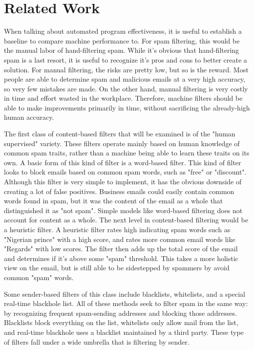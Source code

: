 \documentclass{article}
\begin{document}
\section{Related Work}
\begin{paragraph}
When talking about automated program effectiveness, it is useful to establish a baseline to compare machine performance to. For spam filtering, this would be the manual labor of hand-filtering spam. While it's obvious that hand-filtering spam is a last resort, it is useful to recognize it's pros and cons to better create a solution. For manual filtering, the risks are pretty low, but so is the reward. Most people are able to determine spam and malicious emails at a very high accuracy, so very few mistakes are made. On the other hand, manual filtering is very costly in time and effort wasted in the workplace. Therefore, machine filters should be able to make improvements primarily in time, without sacrificing the already-high human accuracy.
\cite{cormack_2008}
\end{paragraph}
\begin{paragraph}
The first class of content-based filters that will be examined is of the "human supervised" variety. These filters operate mainly based on human knowledge of common spam traits, rather than a machine being able to learn these traits on its own. A basic form of this kind of filter is a word-based filter. This kind of filter looks to block emails based on common spam words, such as "free" or "discount". Although this filter is very simple to implement, it has the obvious downside of creating a lot of false positives. Business emails could easily contain common words found in spam, but it was the content of the email as a whole that distinguished it as "not spam". Simple models like word-based filtering does not account for content as a whole. The next level in content-based filtering would be a heuristic filter. A heuristic filter rates high indicating spam words such as "Nigerian prince" with a high score, and rates more common email words like "Regards" with low scores. The filter then adds up the total score of the email and determines if it's above some "spam" threshold. This takes a more holistic view on the email, but is still able to be sidestepped by spammers by avoid common "spam" words. 
\cite{gomez2000combining}
\end{paragraph}
\begin{paragraph}
Some sender-based filters of this class include blacklists, whitelists, and a special real-time blackhole list. All of these methods seek to filter spam in the same way: by recognizing frequent spam-sending addresses and blocking those addresses. Blacklists block everything on the list, whitelists only allow mail from the list, and real-time blackhole uses a blacklist maintained by a third party. These type of filters fall under a wide umbrella that is filtering by sender. 
\end{paragraph}
\end{document}
